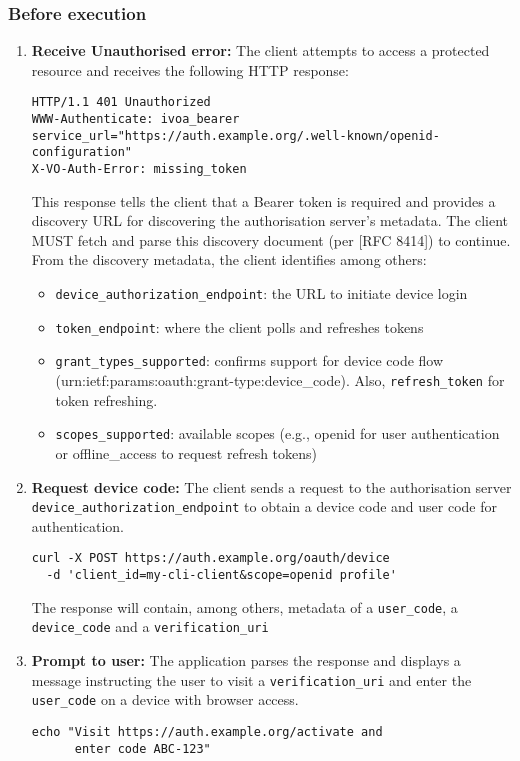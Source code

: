 \documentclass[11pt,a4paper]{ivoa}
\begin{document}
\subsubsection{Before execution}
\begin{enumerate}
\item{\textbf{Receive Unauthorised error:} The client attempts to access a protected resource and receives the following
HTTP response:
\begin{verbatim}
HTTP/1.1 401 Unauthorized
WWW-Authenticate: ivoa_bearer
service_url="https://auth.example.org/.well-known/openid-configuration"
X-VO-Auth-Error: missing_token
\end{verbatim}
This response tells the client that a Bearer token is required and provides a discovery URL for discovering the
authorisation server's metadata. The client MUST fetch and parse this discovery document (per [RFC 8414]) to continue.
From the discovery metadata, the client identifies among others:
\begin{itemize}
\item \verb|device_authorization_endpoint|: the URL to initiate device login
\item \verb|token_endpoint|: where the client polls and refreshes tokens
\item{\verb|grant_types_supported|: confirms support for device code flow (urn:ietf:params:oauth:grant-type:device\_code).
Also, \verb|refresh_token| for token refreshing.}
\item \verb|scopes_supported|: available scopes (e.g., openid for user authentication or offline\_access to request refresh tokens)
\end{itemize}}

\item{\textbf{Request device code:} The client sends a request to the authorisation server \verb|device_authorization_endpoint|
to obtain a device code and user code for authentication.
\begin{verbatim}
curl -X POST https://auth.example.org/oauth/device
  -d 'client_id=my-cli-client&scope=openid profile'
\end{verbatim}}
The response will contain, among others, metadata of a \verb|user_code|, a \verb|device_code| and a \verb|verification_uri|

\item{\textbf{Prompt to user:} The application parses the response and displays a message instructing the user to visit a
              \verb|verification_uri| and enter the \verb|user_code| on a device with browser access.
\begin{verbatim}
echo "Visit https://auth.example.org/activate and
      enter code ABC-123"
\end{verbatim}}


\end{enumerate}
\end{document}
